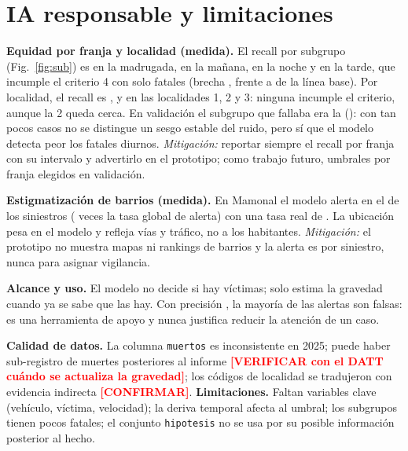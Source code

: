 \documentclass[conference]{IEEEtran}
\newcommand{\pend}[1]{\textcolor{red}{\textbf{[#1]}}}
\begin{document}
\section{IA responsable y limitaciones}
\textbf{Equidad por franja y localidad (medida).} El recall por subgrupo (Fig.~\ref{fig:sub}) es \CifraTestRecMadrugada{} en la
madrugada, \CifraTestRecManana{} en la mañana, \CifraTestRecNoche{} en la noche y \CifraTestTardeRec{} \CifraTestTardeic{} en la
tarde, que incumple el criterio 4 con solo \CifraTestTardeFat{} fatales (brecha \CifraTestBrechaTarde{}, frente a
\CifraTestBrechaTardeBase{} de la línea base). Por localidad, el recall es \CifraTestRecLocUno{} \CifraTestRecLocUnoic{},
\CifraTestRecLocDos{} \CifraTestRecLocDosic{} y \CifraTestRecLocTres{} \CifraTestRecLocTresic{} en las localidades 1, 2 y 3:
ninguna incumple el criterio, aunque la 2 queda cerca. En validación el subgrupo que fallaba era la \CifraValPeorSubgrupo{}
(\CifraValPeorRecall{}): con tan pocos casos no se distingue un sesgo estable del ruido, pero sí que el modelo detecta peor los
fatales diurnos. \emph{Mitigación:} reportar siempre el recall por franja con su intervalo y advertirlo en el prototipo; como
trabajo futuro, umbrales por franja elegidos en validación.

\textbf{Estigmatización de barrios (medida).} En Mamonal el modelo alerta en el \CifraMamonalAlerta{} de los siniestros
(\CifraMamonalVeces{} veces la tasa global de alerta) con una tasa real de \CifraMamonalReal{}. La ubicación pesa en el modelo y
refleja vías y tráfico, no a los habitantes. \emph{Mitigación:} el prototipo no muestra mapas ni rankings de barrios y la alerta
es por siniestro, nunca para asignar vigilancia.

\textbf{Alcance y uso.} El modelo no decide si hay víctimas; solo estima la gravedad cuando ya se sabe que las hay. Con precisión
\CifraTestPrec{}, la mayoría de las alertas son falsas: es una herramienta de apoyo y nunca justifica reducir la atención de un caso.

\textbf{Calidad de datos.} La columna \texttt{muertos} es inconsistente en 2025; puede haber sub-registro de muertes posteriores al
informe \pend{VERIFICAR con el DATT cuándo se actualiza la gravedad}; los códigos de localidad se tradujeron con evidencia indirecta
\pend{CONFIRMAR}. \textbf{Limitaciones.} Faltan variables clave (vehículo, víctima, velocidad); la deriva temporal afecta al umbral;
los subgrupos tienen pocos fatales; el conjunto \texttt{hipotesis} no se usa por su posible información posterior al hecho.
\end{document}
